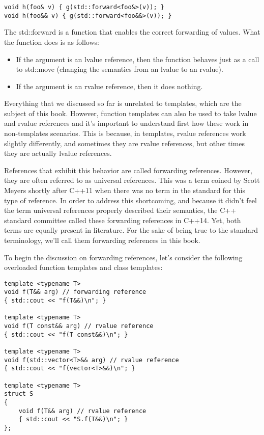\begin{lstlisting}[style=styleCXX]
void h(foo& v) { g(std::forward<foo&>(v)); }
void h(foo&& v) { g(std::forward<foo&&>(v)); }
\end{lstlisting}

The std::forward is a function that enables the correct forwarding of values. What the function does is as follows:

\begin{itemize}
\item
If the argument is an lvalue reference, then the function behaves just as a call to std::move (changing the semantics from an lvalue to an rvalue).

\item
If the argument is an rvalue reference, then it does nothing.
\end{itemize}

Everything that we discussed so far is unrelated to templates, which are the subject of this book. However, function templates can also be used to take lvalue and rvalue references and it’s important to understand first how these work in non-templates scenarios. This is because, in templates, rvalue references work slightly differently, and sometimes they are rvalue references, but other times they are actually lvalue references.

References that exhibit this behavior are called forwarding references. However, they are often referred to as universal references. This was a term coined by Scott Meyers shortly after C++11 when there was no term in the standard for this type of reference. In order to address this shortcoming, and because it didn’t feel the term universal references properly described their semantics, the C++ standard committee called these forwarding references in C++14. Yet, both terms are equally present in literature. For the sake of being true to the standard terminology, we’ll call them forwarding references in this book.

To begin the discussion on forwarding references, let’s consider the following overloaded function templates and class templates:

\begin{lstlisting}[style=styleCXX]
template <typename T>
void f(T&& arg) // forwarding reference
{ std::cout << "f(T&&)\n"; }

template <typename T>
void f(T const&& arg) // rvalue reference
{ std::cout << "f(T const&&)\n"; }

template <typename T>
void f(std::vector<T>&& arg) // rvalue reference
{ std::cout << "f(vector<T>&&)\n"; }

template <typename T>
struct S
{
	void f(T&& arg) // rvalue reference
	{ std::cout << "S.f(T&&)\n"; }
};
\end{lstlisting}


